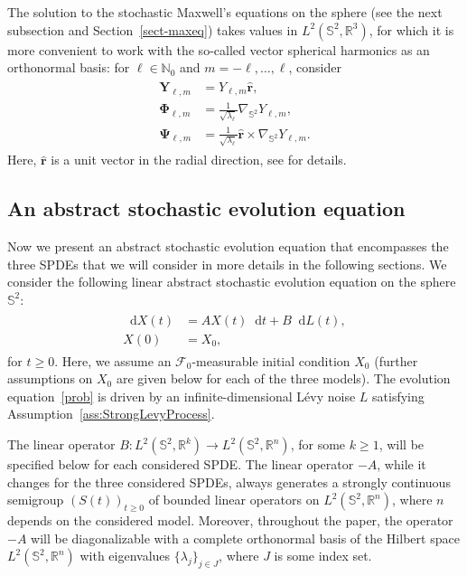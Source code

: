 \documentclass[11pt]{amsart}
\newcommand{\R}{{\mathbb R}}
\newcommand{\IS}{\mathbb{S}}
\newcommand*\dd{\mathop{}\!\mathrm{d}}
\newcommand{\nablalb}{\nabla_{\IS^{2}}}
\begin{document}
The solution to the stochastic Maxwell's equations on the sphere (see the next subsection and Section~\ref{sect-maxeq}) takes values in $L^2(\IS^2,\R^3)$, for which it is more convenient to work with the so-called vector spherical harmonics as an orthonormal basis:
for $\ell\in\mathbb N_0$ and  $m=-\ell,\ldots,\ell$, consider
\begin{align}\label{3d-onb}
    \begin{split}
	\mathbf{Y}_{\ell, m}&=Y_{\ell, m}\hat{\textbf{r}}, \\
	\mathbf{\Phi}_{\ell, m}&=\frac{1}{\sqrt{\lambda_\ell}}\nablalb {Y}_{\ell, m}, \\
	\mathbf{\Psi}_{\ell, m}&=\frac{1}{\sqrt{\lambda_\ell}}\hat{\textbf{r}}\times\nablalb Y_{\ell,m}.
    \end{split}
\end{align}
Here, $\hat{ \textbf{r}}$ is a unit vector in the radial direction, see \cite{Barrera_1985} for details.

\subsection{An abstract stochastic evolution equation}
Now we
present an abstract stochastic evolution equation that encompasses the three SPDEs that we will consider in more details in the following sections. 
We consider the following linear abstract stochastic evolution equation on the  sphere $\IS^{2}$:
\begin{align}\label{prob}
\begin{split}
   \dd X(t)&=AX(t)\dd t+B\dd L(t),\\
    X(0)&=X_0,
\end{split}
\end{align}
for $t \geq 0$.  
Here, we assume an $\mathcal{F}_0$-measurable initial condition 
$X_0$ (further assumptions on $X_0$ are given below for each of the three models). The evolution equation~\eqref{prob} is driven by an infinite-dimensional L\'evy noise $L$ satisfying Assumption~\ref{ass:StrongLevyProcess}.

The linear operator
$B\colon L^2(\IS^2,\mathbb R^k) \to L^2(\IS^2,\mathbb R^n)$, for some $k \geq 1$, will be specified below for each considered SPDE. The linear operator $-A$, while it changes for the three considered SPDEs, always generates a strongly continuous semigroup $(S(t))_{t\geq 0}$ of bounded linear operators on $L^2(\IS^{2},\R^n)$, where $n$ depends on the considered model. Moreover, throughout the paper, the operator $-A$ will be diagonalizable with a complete orthonormal basis of the Hilbert space $L^2(\IS^{2},\R^n)$ with eigenvalues $\{\lambda_j\}_{j\in J}$, where $J$ is some index set.
\end{document}
